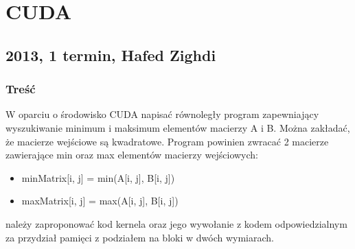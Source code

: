 \newpage
\section{CUDA}
	\subsection{2013, 1 termin, Hafed Zighdi}
		\subsubsection{Treść}
			W oparciu o środowisko CUDA napisać równoległy program zapewniający wyszukiwanie minimum i maksimum elementów macierzy A i B. Można zakładać, że macierze wejściowe są kwadratowe. Program powinien zwracać 2 macierze zawierające min oraz max elementów macierzy wejściowych:
			\begin{itemize}
				\item minMatrix[i, j] = min(A[i, j], B[i, j])
				\item maxMatrix[i, j] = max(A[i, j], B[i, j])
			\end{itemize}
			należy zaproponować kod kernela oraz jego wywołanie z kodem odpowiedzialnym za przydział pamięci z podziałem na bloki w dwóch wymiarach.
